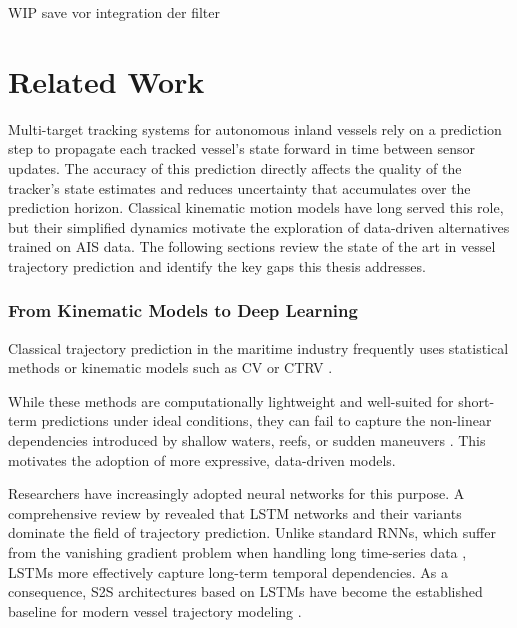 
WIP save vor integration der filter

\chapter{Related Work}
\label{chap:relatedwork}


Multi-target tracking systems for autonomous inland vessels rely on a prediction step to propagate 
each tracked vessel's state forward in time between sensor updates. The accuracy of this prediction 
directly affects the quality of the tracker's state estimates and reduces uncertainty that accumulates
over the prediction horizon. Classical kinematic motion models have long served this role, but 
their simplified dynamics motivate the exploration of data-driven alternatives trained on \ac{AIS} 
data. The following sections review the state of the art in vessel trajectory prediction and 
identify the key gaps this thesis addresses.

\subsection*{From Kinematic Models to Deep Learning}

Classical trajectory prediction in the maritime industry frequently uses statistical methods or kinematic models such as \ac{CV} or \ac{CTRV} \parencite{8693856CV, li2003survey}. %

While these methods are computationally lightweight and well-suited for short-term predictions under ideal conditions, they can fail to capture the  non-linear dependencies introduced by shallow waters, reefs, or sudden maneuvers \parencite{articlebilstmsus}. %
This motivates the adoption of more expressive, data-driven models. 

Researchers have increasingly adopted neural networks for this purpose. A comprehensive review by \textcite{Zhang22} revealed that \ac{LSTM} networks and their variants dominate the field of trajectory prediction. Unlike standard \acp{RNN}, which suffer from the vanishing gradient problem when handling long time-series data \parencite{279181bengio}, \acp{LSTM} more effectively capture long-term temporal dependencies. As a consequence, \ac{S2S} architectures based on \acp{LSTM} have become the established baseline for modern vessel trajectory modeling \parencite{donandt2022shortterm, Zhang22}.

